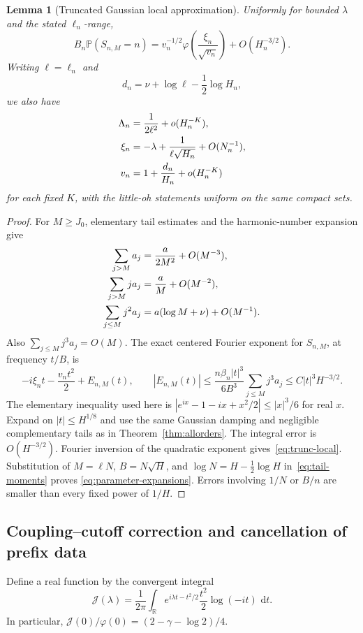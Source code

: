 \documentclass[11pt,a4paper]{article}
\numberwithin{equation}{section}
\newtheorem{lemma}[theorem]{Lemma}
\theoremstyle{definition}
\theoremstyle{remark}
\newcommand{\R}{\mathbb R}
\newcommand{\Prob}{\mathbb P}
\newcommand{\dd}{\,\mathrm d}
\newcommand{\ph}{\varphi}
\newcommand{\cJ}{\mathcal J}
\begin{document}
\begin{lemma}[Truncated Gaussian local approximation]
\label{lem:trunc-local}
Uniformly for bounded \(\lambda\) and the stated \(\ell_n\)-range,
\begin{equation}
 B_n\Prob(S_{n,M}=n)
 =v_n^{-1/2}\ph\!\left(\frac{\xi_n}{\sqrt{v_n}}\right)
 +O(H_n^{-3/2}).
 \label{eq:trunc-local}
\end{equation}
Writing \(\ell=\ell_n\) and
\begin{equation}
 d_n=\nu+\log\ell-\frac12\log H_n,
 \label{eq:d}
\end{equation}
we also have
\begin{align}
 \Lambda_n&=\frac{1}{2\ell^2}+o(H_n^{-K}),\notag\\
 \xi_n&=-\lambda+\frac{1}{\ell\sqrt{H_n}}+O(N_n^{-1}),\notag\\
 v_n&=1+\frac{d_n}{H_n}+o(H_n^{-K})
 \label{eq:parameter-expansions}
\end{align}
for each fixed \(K\), with the little-oh statements uniform on the same
compact sets.
\end{lemma}
\begin{proof}
For \(M\ge J_0\), elementary tail estimates and the harmonic-number
expansion give
\begin{align}
 \sum_{j>M}a_j&=\frac{a}{2M^2}+O(M^{-3}),\notag\\
 \sum_{j>M}ja_j&=\frac aM+O(M^{-2}),\notag\\
 \sum_{j\le M}j^2a_j&=a(\log M+\nu)+O(M^{-1}).
 \label{eq:tail-moments}
\end{align}
Also \(\sum_{j\le M}j^3a_j=O(M)\).
The exact centered Fourier exponent for \(S_{n,M}\), at frequency \(t/B\),
is
\[
 -i\xi_n t-\frac{v_n t^2}{2}+E_{n,M}(t),\qquad
 |E_{n,M}(t)|\le
 \frac{n\beta_n|t|^3}{6B^3}\sum_{j\le M}j^3a_j
 \le C|t|^3H^{-3/2}.
\]
The elementary inequality used here is
\(|e^{ix}-1-ix+x^2/2|\le |x|^3/6\) for real \(x\).
Expand on \(|t|\le H^{1/8}\) and use the same Gaussian damping and
negligible complementary tails as in Theorem~\ref{thm:allorders}.
The integral error is \(O(H^{-3/2})\). Fourier inversion of the quadratic
exponent gives~\eqref{eq:trunc-local}.
Substitution of \(M=\ell N\), \(B=N\sqrt H\), and
\(\log N=H-\tfrac12\log H\) in~\eqref{eq:tail-moments} proves
\eqref{eq:parameter-expansions}. Errors involving \(1/N\) or \(B/n\)
are smaller than every fixed power of \(1/H\).
\end{proof}

\subsection{Coupling--cutoff correction and cancellation of prefix data}
Define a real function by the convergent integral
\begin{equation}
 \cJ(\lambda)=\frac{1}{2\pi}\int_{\R}
 e^{i\lambda t-t^2/2}\frac{t^2}{2}\log(-it)\,\dd t.
 \label{eq:J}
\end{equation}
In particular,
\(\cJ(0)/\ph(0)=(2-\gamma-\log2)/4\).
\end{document}
